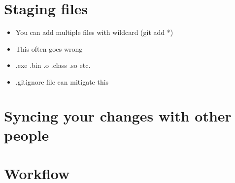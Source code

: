 \documentclass{beamer}
\begin{document}
\section{Staging files}
\begin{frame}
\begin{itemize}
\item You can add multiple files with wildcard (git add *)
\item This often goes wrong
\item .exe .bin .o .class .so etc.
\item .gitignore file can mitigate this
\end{itemize}
\end{frame}

\section{Syncing your changes with other people}
\begin{frame}
\end{frame}

\section{Workflow}
\begin{frame}
\end{frame}
\end{document}
